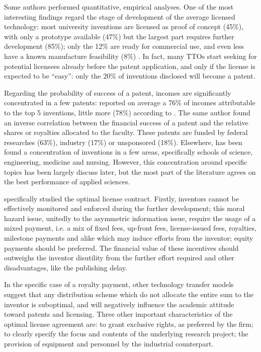 Some authors performed quantitative, empirical analyses. One of the most interesting findings regard the stage of development of the average licensed technology: most university inventions are licensed as proof of concept (45\%), with only a prototype available (47\%) but the largest part requires further development (85\%); only the 12\% are ready for commercial use, and even less have a known manufacture feasibility (8\%) \citep{Thursby2002}. In fact, many TTOs start seeking for potential licensees already before the patent application, and only if the license is expected to be \enquote{easy}: only the 20\% of inventions disclosed will become a patent.

Regarding the probability of success of a patent, incomes are significantly concentrated in a few patents: \citet{Thursby2002} reported on average a 76\% of incomes attributable to the top 5 inventions, little more (78\%) according to \citet{Jensen2003}. The same author found an inverse correlation between the financial success of a patent and the relative shares or royalties allocated to the faculty. These patents are funded by federal researches (63\%), industry (17\%) or unsponsored (18\%). Elsewhere, has been found a concentration of inventions in a few areas, specifically schools of science, engineering, medicine and nursing. However, this concentration around specific topics has been largely discuss later, but the most part of the literature agrees on the best performance of applied sciences. 

\citet{Jensen2003} specifically studied the optimal license contract. Firstly, inventors cannot be effectively monitored and enforced during the further development; this moral hazard issue, unitedly to the asymmetric information issue, require the usage of a mixed payment, i.e. a mix of fixed fees, up-front fees, license-issued fees, royalties, milestone payments and alike which may induce efforts from the inventor; equity payments should be preferred. The financial value of these incentives should outweighs the inventor disutility from the further effort required and other disadvantages, like the publishing delay. 

In the specific case of a royalty payment, other technology transfer models suggest that any distribution scheme which do not allocate the entire sum to the inventor is suboptimal, and will negatively influence the academic attitude toward patents and licensing. Three other important characteristics of the optimal license agreement are: to grant exclusive rights, as preferred by the firm; to clearly specify the focus and contents of the underlying research project; the provision of equipment and personnel by the industrial counterpart. 

